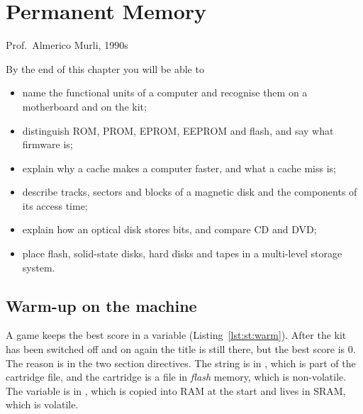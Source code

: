 \chapter{Permanent Memory}
\label{ch:storage}

  {Prof.\ Almerico Murli, 1990s}

\begin{chapgoals}
By the end of this chapter you will be able to
\begin{itemize}
\item name the functional units of a computer and recognise them on a motherboard and on the \prg kit;
\item distinguish ROM, PROM, EPROM, EEPROM and flash, and say what firmware is;
\item explain why a cache makes a computer faster, and what a cache miss is;
\item describe tracks, sectors and blocks of a magnetic disk and the components of its access time;
\item explain how an optical disk stores bits, and compare CD and DVD;
\item place flash, solid-state disks, hard disks and tapes in a multi-level storage system.
\end{itemize}
\end{chapgoals}


\section{Warm-up on the machine}


A game keeps the best score in a variable (Listing~\ref{lst:st:warm}). After
the kit has been switched off and on again the title is still there, but the
best score is 0. The reason is in the two section directives. The string is
in , which is part of the cartridge file, and the cartridge is a
file in \emph{flash} memory, which is non-volatile. The variable is in
, which is copied into RAM at the start and lives in SRAM, which
is volatile.

